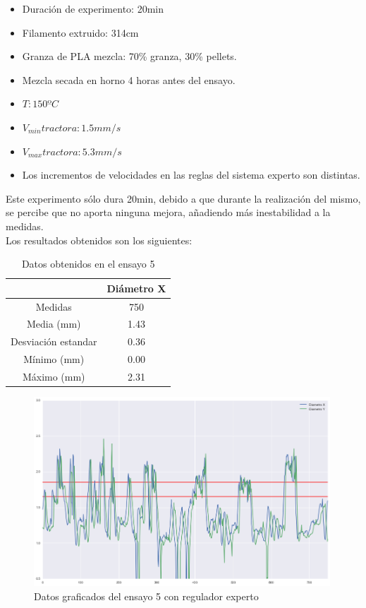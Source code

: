 \begin{itemize}
	\item{Duración de experimento: 20min}
	\item{Filamento extruido: 314cm}
	\item{Granza de PLA mezcla: 70\% granza, 30\% pellets.}
	\item{Mezcla secada en horno 4 horas antes del ensayo.}
	\item{$T: 150ºC$}
	\item{$V_{min} tractora: 1.5 mm/s$}
	\item{$V_{max} tractora: 5.3 mm/s$}
	\item{Los incrementos de velocidades en las reglas del sistema experto son distintas.}
\end{itemize}

Este experimento sólo dura 20min, debido a que durante la realización del mismo, se percibe que no aporta ninguna mejora, añadiendo más inestabilidad a la medidas.\\

Los resultados obtenidos son los siguientes:

\begin{table}[H]
	\centering
	\begin{tabular}{cc}
		                    & Diámetro X \\ \hline
		Medidas             & 750      \\
		Media (mm)          & 1.43       \\
		Desviación estandar & 0.36       \\
		Mínimo (mm)         & 0.00       \\
		Máximo (mm)         & 2.31      
	\end{tabular}
	\caption{Datos obtenidos en el ensayo 5}
	\label{tab:resl_ens5}
\end{table}

\begin{figure}[H]
    \centering
    \includegraphics[width=0.99\textwidth]{images/producciones/13082015/output_9_e2.png}
    \caption{Datos graficados del ensayo 5 con regulador experto}
    \label{fig:reg_graf5}
\end{figure}

